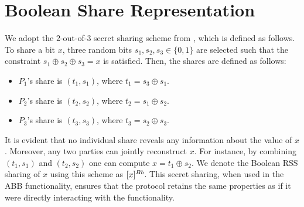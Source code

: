 \section{Boolean Share Representation}

We adopt the $2$-out-of-$3$ secret sharing scheme from \cite{EC:FLNW17}, which is defined as follows.
To share a bit $x$, three random bits $s_1, s_2, s_3 \in \{0, 1\}$ are selected such that the constraint $s_1 \oplus s_2 \oplus s_3 = x$ is satisfied. 
Then, the shares are defined as follows:

\begin{itemize}
    \item $P_1$'s share is $(t_1, s_1)$, where $t_1 = s_3 \oplus s_1$.
    \item $P_2$'s share is $(t_2, s_2)$, where $t_2 = s_1 \oplus s_2$.
    \item $P_3$'s share is $(t_3, s_3)$, where $t_3 = s_2 \oplus s_3$.
\end{itemize}

It is evident that no individual share reveals any information about the value of $x$.
Moreover, any two parties can jointly reconstruct $x$. For instance, by combining $(t_1, s_1)$ and $(t_2, s_2)$ one can compute $x = t_1 \oplus s_2$. 
We denote the Boolean RSS sharing of $x$ using this scheme as $[x]^{Bb}$. 
This secret sharing, when used in the ABB functionality, ensures that the protocol retains the same properties as if it were directly interacting with the functionality.